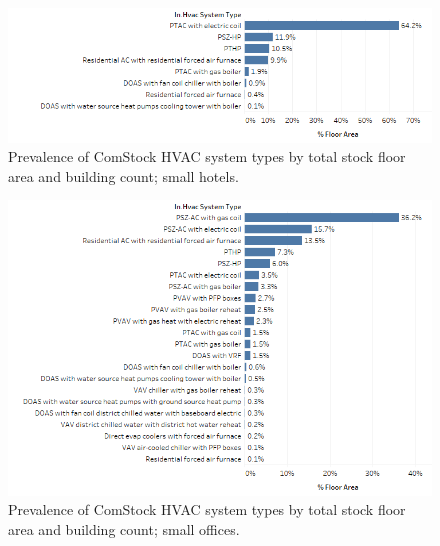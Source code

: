 \begin{figure}
    \centering \includegraphics[width=1.0\textwidth]{figures/HVAC_SYS_Type_PREV_Small_Hotel.png}
    \caption[HVAC system type prevalence in small hotels]{Prevalence of ComStock HVAC system types by total stock floor area and building count; small hotels.}
    \label{fig:hvac_sys_type_prevalence_small_hotel}
\end{figure}

\begin{figure}
    \centering \includegraphics[width=1.0\textwidth]{figures/HVAC_SYS_Type_PREV_Small_Office.png}
    \caption[HVAC system type prevalence in small offices]{Prevalence of ComStock HVAC system types by total stock floor area and building count; small offices.}
    \label{fig:hvac_sys_type_prevalence_small_office}
\end{figure}

